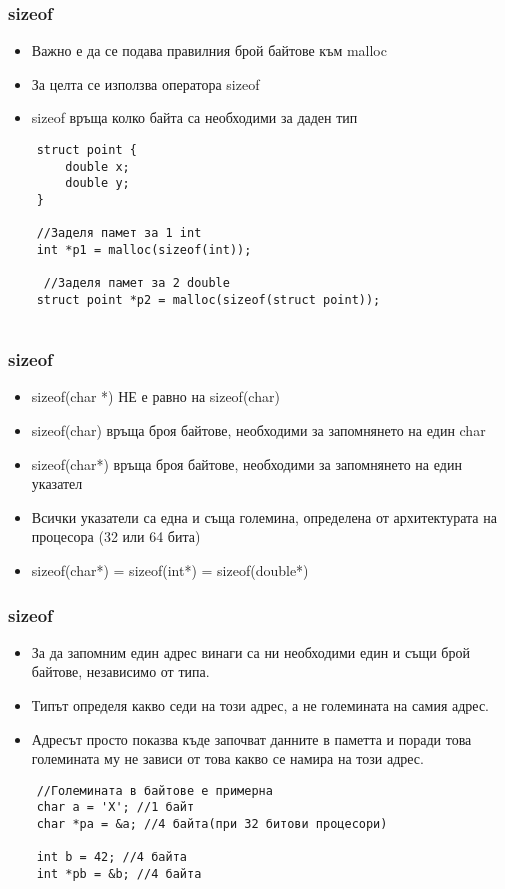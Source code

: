 \documentclass[ignorenonframetext, hyperref=unicode]{beamer}
\begin{document}
\begin{frame}[containsverbatim]
\frametitle{sizeof}
\begin{itemize}
  \item Важно е да се подава правилния брой байтове към malloc
  \item За целта се използва оператора sizeof
  \item sizeof връща колко байта са необходими за даден тип
\end{itemize}
\begin{lstlisting}
	struct point {
		double x;
		double y;
	} 

	//Заделя памет за 1 int
	int *p1 = malloc(sizeof(int)); 
	
	 //Заделя памет за 2 double
	struct point *p2 = malloc(sizeof(struct point));
	
\end{lstlisting}
\end{frame}

\begin{frame}[containsverbatim]
\frametitle{sizeof}
\begin{itemize}
  \item sizeof(char *) НЕ е равно на sizeof(char)
  \item sizeof(char) връща броя байтове, необходими за запомнянето на един char
  \item sizeof(char*) връща броя байтове, необходими за запомнянето на един указател
  \item Всички указатели са една и съща големина, определена от архитектурата на процесора (32 или 64 бита)
  \item sizeof(char*) = sizeof(int*) = sizeof(double*)
\end{itemize}
\end{frame}

\begin{frame}[containsverbatim]
\frametitle{sizeof}
\begin{itemize}
	\item За да запомним един адрес винаги са ни необходими един и същи брой байтове, независимо от типа.
	\item Типът определя какво седи на този адрес, а не големината на самия адрес.
	\item Адресът просто показва къде започват данните в паметта и поради това големината му не зависи от това какво се намира на този адрес.
\end{itemize}
\begin{lstlisting}
	//Големината в байтове е примерна
	char a = 'X'; //1 байт
	char *pa = &a; //4 байта(при 32 битови процесори)
	
	int b = 42; //4 байта
	int *pb = &b; //4 байта
	
\end{lstlisting}
\end{frame}
\end{document}
